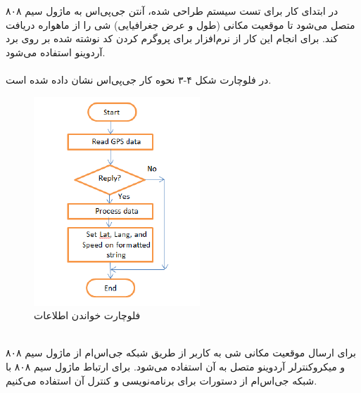 در ابتدای کار برای تست سیستم طراحی شده، آنتن جی‌پی‌اس به ماژول سیم ۸۰۸ متصل می‌شود تا موقعیت مکانی (طول و عرض جغرافیایی) شی را از ماهواره دریافت کند. برای انجام این کار از نرم‌افزار  برای پروگرم کردن کد نوشته شده بر روی برد آردوینو استفاده می‌شود.\\
\\
در فلوچارت شکل ۴-۳ نحوه کار جی‌پی‌اس نشان داده شده است.
\begin{figure}[!h]
	\centerline{\includegraphics[width=.6\textwidth]{gps-flowchart}}
	\caption{فلوچارت خواندن اطلاعات  \cite{ElShafee2013}}
\end{figure}
\\

برای ارسال موقعیت مکانی شی به کاربر از طریق شبکه جی‌اس‌ام از ماژول سیم ۸۰۸ و میکروکنترلر آردوینو متصل به آن استفاده می‌شود. برای ارتباط ماژول سیم ۸۰۸ با شبکه جی‌اس‌ام از دستورات  برای برنامه‌نویسی و کنترل آن استفاده می‌کنیم.\\

